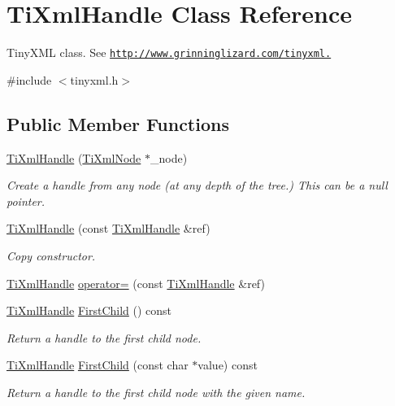\hypertarget{class_ti_xml_handle}{
\section{TiXmlHandle Class Reference}
\label{class_ti_xml_handle}
}


TinyXML class. See \href{http://www.grinninglizard.com/tinyxml.}{\tt http://www.grinninglizard.com/tinyxml.}  


{\ttfamily \#include $<$tinyxml.h$>$}\subsection*{Public Member Functions}
\begin{DoxyCompactItemize}
\item 
\hyperlink{class_ti_xml_handle_aba18fd7bdefb942ecdea4bf4b8e29ec8}{TiXmlHandle} (\hyperlink{class_ti_xml_node}{TiXmlNode} $\ast$\_\-node)
\begin{DoxyCompactList}\small\item\em Create a handle from any node (at any depth of the tree.) This can be a null pointer. \item\end{DoxyCompactList}\item 
\hyperlink{class_ti_xml_handle_a236d7855e1e56ccc7b980630c48c7fd7}{TiXmlHandle} (const \hyperlink{class_ti_xml_handle}{TiXmlHandle} \&ref)
\begin{DoxyCompactList}\small\item\em Copy constructor. \item\end{DoxyCompactList}\item 
\hyperlink{class_ti_xml_handle}{TiXmlHandle} \hyperlink{class_ti_xml_handle_ad8e5dcf6a87882674203157f29f8e4db}{operator=} (const \hyperlink{class_ti_xml_handle}{TiXmlHandle} \&ref)
\item 
\hyperlink{class_ti_xml_handle}{TiXmlHandle} \hyperlink{class_ti_xml_handle_acdb1faaf88a700b40ca2c8d9aee21139}{FirstChild} () const 
\begin{DoxyCompactList}\small\item\em Return a handle to the first child node. \item\end{DoxyCompactList}\item 
\hyperlink{class_ti_xml_handle}{TiXmlHandle} \hyperlink{class_ti_xml_handle_a8c61f64ae9365d89c264f289085541f8}{FirstChild} (const char $\ast$value) const 
\begin{DoxyCompactList}\small\item\em Return a handle to the first child node with the given name. \item\end{DoxyCompactList}\item 

\end{DoxyCompactItemize}
